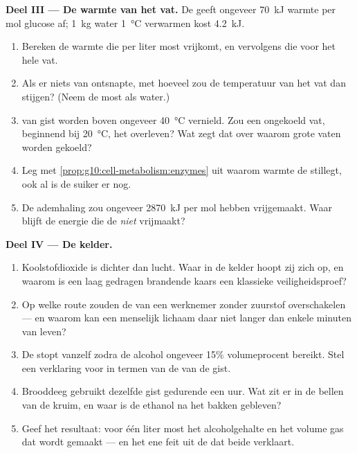 \begin{problem}
\medskip
\noindent\textbf{Deel III --- De warmte van het vat.}
De  geeft ongeveer \qty{70}{kJ} warmte per mol glucose af;
\qty{1}{kg} water \qty{1}{\celsius} verwarmen kost \qty{4.2}{kJ}.
\begin{enumerate}[resume]
  \item Bereken de warmte die per liter most vrijkomt, en vervolgens die
        voor het hele vat.
  \item Als er niets van ontsnapte, met hoeveel zou de temperatuur van
        het vat dan stijgen? (Neem de most als water.)
  \item {} van gist worden boven ongeveer \qty{40}{\celsius}
        vernield. Zou een ongekoeld vat, beginnend bij
        \qty{20}{\celsius}, het overleven? Wat zegt dat over waarom
        grote vaten worden gekoeld?
  \item Leg met \cref{prop:g10:cell-metabolism:enzymes} uit waarom
        warmte de  stillegt, ook al is de suiker er nog.
  \item De ademhaling zou ongeveer \qty{2870}{kJ} per mol hebben
        vrijgemaakt. Waar blijft de energie die de  \emph{niet}
        vrijmaakt?
\end{enumerate}

\medskip
\noindent\textbf{Deel IV --- De kelder.}
\begin{enumerate}[resume]
  \item Koolstofdioxide is dichter dan lucht. Waar in de kelder hoopt zij
        zich op, en waarom is een laag gedragen brandende kaars een
        klassieke veiligheidsproef?
  \item Op welke route zouden de  van een werknemer zonder
        zuurstof overschakelen --- en waarom kan een menselijk lichaam
        daar niet langer dan enkele minuten van leven?
  \item De  stopt vanzelf zodra de alcohol ongeveer 15\%
        volumeprocent bereikt. Stel een verklaring voor in termen van de
         van de gist.
  \item Brooddeeg gebruikt dezelfde gist gedurende een uur. Wat zit er
        in de bellen van de kruim, en waar is de ethanol na het bakken
        gebleven?
  \item Geef het resultaat: voor één liter most het alcoholgehalte en het
        volume gas dat wordt gemaakt --- en het ene feit uit de
         dat beide verklaart.
\end{enumerate}
\end{problem}

